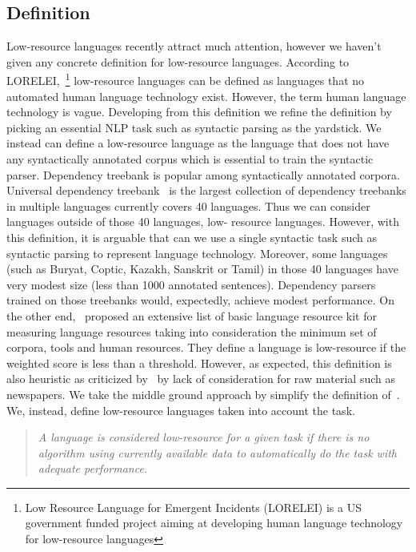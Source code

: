 \documentclass[12pt,twoside,final,hidelinks]{ltthesis}
\theoremstyle{definition}
\begin{document}
\subsection{Definition}
Low-resource languages recently attract much attention, however we haven't given 
any concrete definition for low-resource languages. According to LORELEI,~\footnote{Low Resource Language for Emergent Incidents (LORELEI) is a US government funded project aiming at developing 
human language technology for low-resource languages} low-resource 
languages can be defined as  languages that no automated human language technology exist. 
However, the term human language technology is vague. Developing from this definition 
we refine the definition by picking an essential NLP task such as syntactic parsing as the yardstick. 
We instead can define a low-resource language as the 
language that does not have any syntactically annotated corpus which is essential 
to train the syntactic parser. Dependency treebank is popular among syntactically annotated corpora. 
Universal dependency treebank~\cite{11234/1-1699} 
is the largest collection of dependency treebanks in multiple languages currently 
covers 40 languages. Thus we can consider languages outside of those 40 languages, low-
resource languages. However, with this definition, it is arguable that can we use a single syntactic task such as 
syntactic parsing to represent language technology. Moreover, some languages (such as Buryat, Coptic, Kazakh, Sanskrit or Tamil) in those 40 languages have very modest size (less than 1000 annotated sentences). Dependency parsers trained on those treebanks would, expectedly, achieve 
modest performance. On the other end,~ proposed an extensive list of basic language resource kit for 
measuring language resources taking into consideration the minimum set of corpora, tools and human resources. They define a language is 
low-resource if the weighted score is less than a threshold. However, as expected, this definition is also heuristic as criticized by~ by lack of consideration for raw material such as newspapers. 
We take the middle ground approach by simplify the definition of~. 
We, instead, define low-resource languages taken into account the task. 
\begin{quote}
\textit{A language is considered low-resource for a given task if there is no algorithm using currently available data to automatically do the task 
with adequate performance.}
\end{quote}
\end{document}
